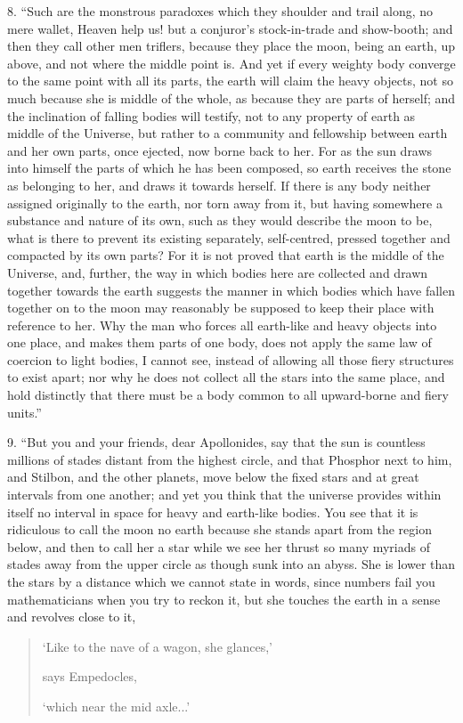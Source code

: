 \documentclass[a4paper, 11pt, oneside, polutonikogreek, english]{article}
\begin{document}
8. ``Such are the monstrous paradoxes which they shoulder and trail along, no mere wallet, Heaven help us! but a conjuror's stock-in-trade and show-booth; and then they call other men triflers, because they place the moon, being an earth, up above, and not where the middle point is. And yet if every weighty body converge to the same point with all its parts, the earth will claim the heavy objects, not so much because she is middle of the whole, as because they are parts of herself; and the inclination of falling bodies will testify, not to any property of earth as middle of the Universe, but rather to a community and fellowship between earth and her own parts, once ejected, now borne back to her. For as the sun draws into himself the parts of which he has been composed, so earth receives the stone as belonging to her, and draws it towards herself. If there is any body neither assigned originally to the earth, nor torn away from it, but having somewhere a substance and nature of its own, such as they would describe the moon to be, what is there to prevent its existing separately, self-centred, pressed together and compacted by its own parts? For it is not proved that earth is the middle of the Universe, and, further, the way in which bodies here are collected and drawn together towards the earth suggests the manner in which bodies which have fallen together on to the moon may reasonably be supposed to keep their place with reference to her. Why the man who forces all earth-like and heavy objects into one place, and makes them parts of one body, does not apply the same law of coercion to light bodies, I cannot see, instead of allowing all those fiery structures to exist apart; nor why he does not collect all the stars into the same place, and hold distinctly that there must be a body common to all upward-borne and fiery units.''

9. ``But you and your friends, dear Apollonides, say that the sun is countless millions of stades distant from the highest circle, and that Phosphor next to him, and Stilbon, and the other planets, move below the fixed stars and at great intervals from one another; and yet you think that the universe provides within itself no interval in space for heavy and earth-like bodies. You see that it is ridiculous to call the moon no earth because she stands apart from the region below, and then to call her a star while we see her thrust so many myriads of stades away from the upper circle as though sunk into an abyss. She is lower than the stars by a distance which we cannot state in words, since numbers fail you mathematicians when you try to reckon it, but she touches the earth in a sense and revolves close to it,
\begin{quotation}
`Like to the nave of a wagon, she glances,'

says Empedocles,

`which near the mid axle...'
\end{quotation}
\end{document}
